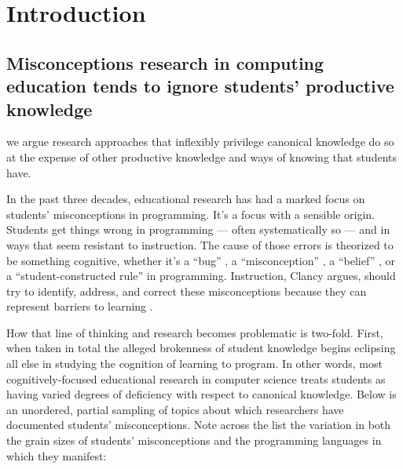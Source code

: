 \section{Introduction}\label{Introduction}

\subsection{Misconceptions research in computing education tends to
ignore students' productive
knowledge}\label{misconceptions-research-in-computing-education-tends-to-ignore-students-productive-knowledge}

we argue research
approaches that inflexibly privilege canonical knowledge do so at the
expense of other productive knowledge and ways of knowing that students
have.

In the past three decades, educational research has had a marked focus
on students' misconceptions in programming. It's a focus with a sensible
origin. Students get things wrong in programming --- often
systematically so --- and in ways that seem resistant to instruction.
The cause of those errors is theorized to be something cognitive,
whether it's a ``bug'' \cite{pea_buggy_1987,pea_languageindependent_1986,vanlehn_mind_1990}, a
``misconception'' \cite{bayman_diagnosis_1983,bonar_preprogramming_1985,clancy_misconceptions_2004,gal-ezer_efficiency_2004,herman_proof_2008,kaczmarczyk_identifying_2010}, a ``belief'' \cite{fleury_student_1993}, or a ``student-constructed
rule'' \cite{fleury_parameter_1991,fleury_programming_2000} in programming. Instruction, Clancy argues, should try to identify,
address, and correct these misconceptions because they
can represent barriers to learning \cite{clancy_misconceptions_2004}.

How that line of thinking and research becomes problematic is two-fold.
First, when taken in total the alleged brokenness of student knowledge
begins eclipsing all else in studying the cognition of learning to
program. In other words, most cognitively-focused educational research
in computer science treats students as having varied degrees of
deficiency with respect to canonical knowledge. Below is an unordered,
partial sampling of topics about which researchers have documented
students' misconceptions. Note across the list the variation in both the
grain sizes of students' misconceptions and the programming languages in
which they manifest:

